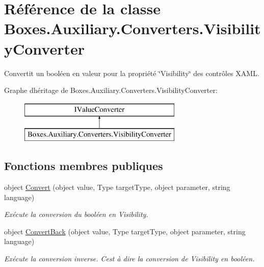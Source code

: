\hypertarget{class_boxes_1_1_auxiliary_1_1_converters_1_1_visibility_converter}{}\section{Référence de la classe Boxes.\+Auxiliary.\+Converters.\+Visibility\+Converter}
\label{class_boxes_1_1_auxiliary_1_1_converters_1_1_visibility_converter}


Convertit un booléen en valeur pour la propriété \char`\"{}\+Visibility\char`\"{} des contrôles X\+A\+ML.  


Graphe d\textquotesingle{}héritage de Boxes.\+Auxiliary.\+Converters.\+Visibility\+Converter\+:\begin{figure}[H]
\begin{center}
\leavevmode
\includegraphics[height=2.000000cm]{class_boxes_1_1_auxiliary_1_1_converters_1_1_visibility_converter}
\end{center}
\end{figure}
\subsection*{Fonctions membres publiques}
\begin{DoxyCompactItemize}
\item 
object \hyperlink{class_boxes_1_1_auxiliary_1_1_converters_1_1_visibility_converter_a2e34d935e275c4f417c5155bd7a92c20}{Convert} (object value, Type target\+Type, object parameter, string language)
\begin{DoxyCompactList}\small\item\em Exécute la conversion du booléen en Visibility. \end{DoxyCompactList}\item 
object \hyperlink{class_boxes_1_1_auxiliary_1_1_converters_1_1_visibility_converter_ae608c229ee1e6c71a3a1e1b343eff849}{Convert\+Back} (object value, Type target\+Type, object parameter, string language)
\begin{DoxyCompactList}\small\item\em Exécute la conversion inverse. C\textquotesingle{}est à dire la conversion de Visibility en booléen. \end{DoxyCompactList}\end{DoxyCompactItemize}


